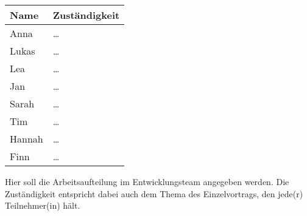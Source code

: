 \begin{tabular}{ll}
 \rowcolor[HTML]{E7E7E7} 
 \textbf{Name} & \textbf{Zuständigkeit} \\ \hline
 Anna & \dots \\ 
 \rowcolor[HTML]{E7E7E7} 
 Lukas & \dots \\ 
 Lea & \dots \\ 
 \rowcolor[HTML]{E7E7E7}
 Jan & \dots \\ 
 Sarah & \dots \\ 
 \rowcolor[HTML]{E7E7E7}
 Tim &  \dots \\ 
 Hannah & \dots \\ 
 \rowcolor[HTML]{E7E7E7}
 Finn & \dots \\ 
\end{tabular}

\bigskip

\begin{tcolorbox}
Hier soll die Arbeitsaufteilung im Entwicklungsteam angegeben werden. Die Zuständigkeit entspricht dabei auch dem Thema des Einzelvortrags, den jede(r) Teilnehmer(in) hält.
\end{tcolorbox}